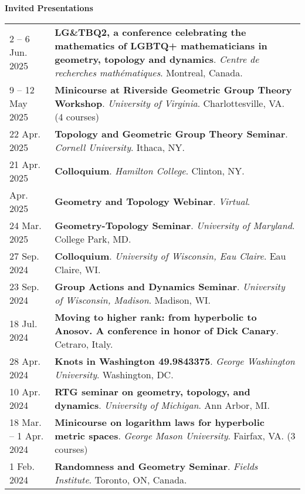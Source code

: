 
    \medskip


    \medskip
    \medskip



    \textbf{\large Invited Presentations}
    
    \begin{center}
    {
    \renewcommand{\arraystretch}{1.5}
    \begin{longtable}{p{}  p{}}
    2  -- 6 Jun.  2025 & \textbf{LG\&TBQ2, a conference celebrating the mathematics of LGBTQ+ mathematicians in geometry, topology and dynamics}. \textit{Centre de recherches math\'ematiques}.  Montreal, Canada.  \\ 
9  -- 12 May  2025 & \textbf{Minicourse at Riverside Geometric Group Theory Workshop}. \textit{University of Virginia}.  Charlottesville, VA. (4 courses) \\ 
22 Apr.  2025 & \textbf{Topology and Geometric Group Theory Seminar}. \textit{Cornell University}.  Ithaca, NY.  \\ 
21 Apr.  2025 & \textbf{Colloquium}. \textit{Hamilton College}.  Clinton, NY.  \\ 
 Apr.  2025 & \textbf{Geometry and Topology Webinar}. \textit{Virtual}.  \\ 
24 Mar.  2025 & \textbf{Geometry-Topology Seminar}. \textit{University of Maryland}.  College Park, MD.  \\ 
27 Sep.  2024 & \textbf{Colloquium}. \textit{University of Wisconsin, Eau Claire}.  Eau Claire, WI.  \\ 
23 Sep.  2024 & \textbf{Group Actions and Dynamics Seminar}. \textit{University of Wisconsin, Madison}.  Madison, WI.  \\ 
18 Jul.  2024 & \textbf{Moving to higher rank: 
from hyperbolic to Anosov.
A conference in honor of Dick Canary}.  Cetraro, Italy.  \\ 
28 Apr.  2024 & \textbf{Knots in Washington 49.9843375}. \textit{George Washington University}.  Washington, DC.  \\ 
10 Apr.  2024 & \textbf{RTG seminar on geometry, topology, and dynamics}. \textit{University of Michigan}.  Ann Arbor, MI.  \\ 
18 Mar.  -- 1 Apr.  2024 & \textbf{Minicourse on logarithm laws for hyperbolic metric spaces}. \textit{George Mason University}.  Fairfax, VA. (3 courses) \\ 
1 Feb.  2024 & \textbf{Randomness and Geometry Seminar}. \textit{Fields Institute}.  Toronto, ON, Canada.  \\ 

\end{longtable}}
\end{center}
